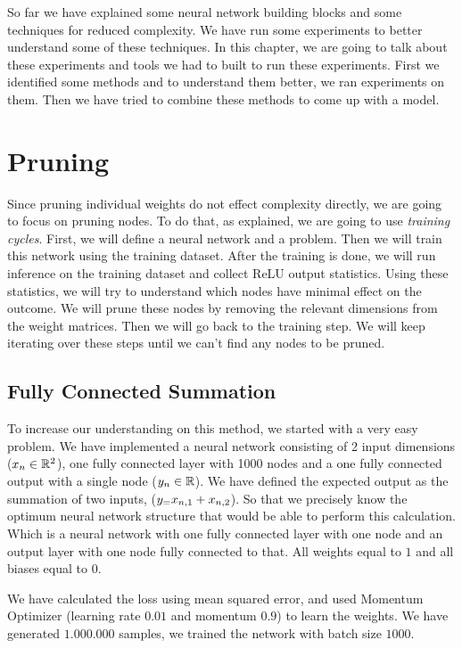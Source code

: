 So far we have explained some neural network building blocks and some techniques for reduced complexity. We have run some experiments to better understand some of these techniques. In this chapter, we are going to talk about these experiments and tools we had to built to run these experiments. First we identified some methods and to understand them better, we ran experiments on them. Then we have tried to combine these methods to come up with a model. 

\section{Pruning}
Since pruning individual weights do not effect complexity directly, we are going to focus on pruning nodes. To do that, as \cite{Hu:2016aa} explained, we are going to use \textit{training cycles}. First, we will define a neural network and a problem. Then we will train this network using the training dataset. After the training is done, we will run inference on the training dataset and collect ReLU output statistics. Using these statistics, we will try to understand which nodes have minimal effect on the outcome. We will prune these nodes by removing the relevant dimensions from the weight matrices. Then we will go back to the training step. We will keep iterating over these steps until we can't find any nodes to be pruned.

\subsection{Fully Connected Summation}
To increase our understanding on this method, we started with a very easy problem. We have implemented a neural network consisting of 2 input dimensions ($x_{n} \in \mathbb{R}^{2}$), one fully connected layer with 1000 nodes and a one fully connected output with a single node ($y_{n} \in \mathbb{R}$). We have defined the expected output as the summation of two inputs, ($y_{=} x_{n,1} + x_{n,2}$). So that we precisely know the optimum neural network structure that would be able to perform this calculation. Which is a neural network with one fully connected layer with one node and an output layer with one node fully connected to that. All weights equal to $1$ and all biases equal to $0$.

We have calculated the loss using mean squared error, and used Momentum Optimizer (learning rate $0.01$ and momentum $0.9$) to learn the weights. We have generated $1.000.000$ samples, we trained the network with batch size $1000$.

